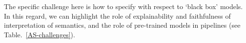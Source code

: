 \documentclass[sigconf,nonacm]{acmart}%
\begin{document}
The specific challenge here is how to specify with respect to `black box' models. In this regard, we can highlight the role of explainability and faithfulness of interpretation of semantics, and the role of pre-trained models in pipelines (see Table.~\ref{AS-challenges}). 

\footnotesize
\end{document}
